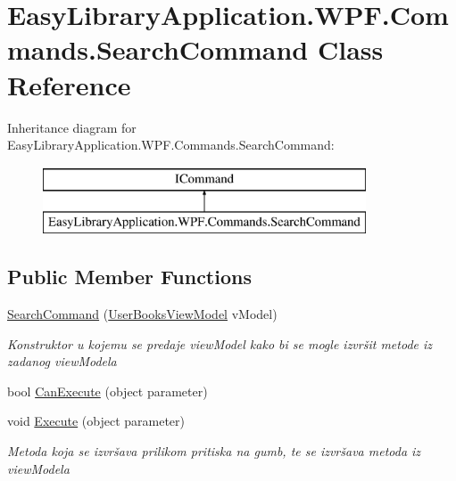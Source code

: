 \hypertarget{class_easy_library_application_1_1_w_p_f_1_1_commands_1_1_search_command}{}\section{Easy\+Library\+Application.\+W\+P\+F.\+Commands.\+Search\+Command Class Reference}
\label{class_easy_library_application_1_1_w_p_f_1_1_commands_1_1_search_command}
Inheritance diagram for Easy\+Library\+Application.\+W\+P\+F.\+Commands.\+Search\+Command\+:\begin{figure}[H]
\begin{center}
\leavevmode
\includegraphics[height=2.000000cm]{class_easy_library_application_1_1_w_p_f_1_1_commands_1_1_search_command}
\end{center}
\end{figure}
\subsection*{Public Member Functions}
\begin{DoxyCompactItemize}
\item 
\mbox{\hyperlink{class_easy_library_application_1_1_w_p_f_1_1_commands_1_1_search_command_ac22debbcbdc2cc9e0cd3a2ddfb50961c}{Search\+Command}} (\mbox{\hyperlink{class_easy_library_application_1_1_w_p_f_1_1_view_model_1_1_user_books_view_model}{User\+Books\+View\+Model}} v\+Model)
\begin{DoxyCompactList}\small\item\em Konstruktor u kojemu se predaje view\+Model kako bi se mogle izvršit metode iz zadanog view\+Modela \end{DoxyCompactList}\item 
bool \mbox{\hyperlink{class_easy_library_application_1_1_w_p_f_1_1_commands_1_1_search_command_a6235f817a674a653d65022b0d148985d}{Can\+Execute}} (object parameter)
\item 
void \mbox{\hyperlink{class_easy_library_application_1_1_w_p_f_1_1_commands_1_1_search_command_a6cb7e5d0f2321b1b5f5871cb84484d88}{Execute}} (object parameter)
\begin{DoxyCompactList}\small\item\em Metoda koja se izvršava prilikom pritiska na gumb, te se izvršava metoda iz view\+Modela \end{DoxyCompactList}\end{DoxyCompactItemize}
